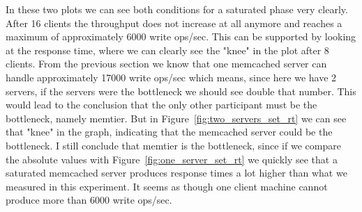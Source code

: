 \documentclass[11pt,a4paper]{article}
\begin{document}
%
In these two plots we can see both conditions for a saturated phase very clearly.
%
After 16 clients the throughput does not increase at all anymore and reaches a maximum of approximately 6000 write ops/sec.
%
This can be supported by looking at the response time, where we can clearly see the "knee" in the plot after 8 clients.
%
From the previous section we know that one memcached server can handle approximately 17000 write ops/sec which means, since here we have 2 servers, if the servers were the bottleneck we should see double that number.
%
This would lead to the conclusion that the only other participant must be the bottleneck, namely memtier.
%
But in Figure~\ref{fig:two_servers_set_rt} we can see that "knee" in the graph, indicating that the memcached server could be the bottleneck.
%
I still conclude that memtier is the bottleneck, since if we compare the absolute values with Figure~\ref{fig:one_server_set_rt} we quickly see that a saturated memcached server produces response times a lot higher than what we measured in this experiment.
%
It seems as though one client machine cannot produce more than 6000 write ops/sec.
%
\end{document}
